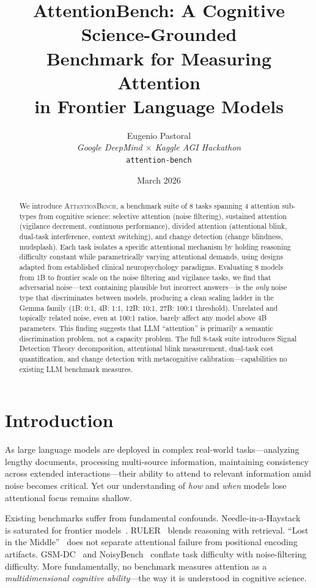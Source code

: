 \documentclass[11pt,twocolumn]{article}
\title{AttentionBench: A Cognitive Science-Grounded\\Benchmark for Measuring Attention\\in Frontier Language Models}
\author{%
  Eugenio Pastoral\\
  \textit{Google DeepMind $\times$ Kaggle AGI Hackathon}\\
  \texttt{attention-bench}
}
\date{March 2026}
\begin{document}
\maketitle

\begin{abstract}
We introduce \textsc{AttentionBench}, a benchmark suite of 8 tasks spanning 4 attention sub-types from cognitive science: selective attention (noise filtering), sustained attention (vigilance decrement, continuous performance), divided attention (attentional blink, dual-task interference, context switching), and change detection (change blindness, mudsplash). Each task isolates a specific attentional mechanism by holding reasoning difficulty constant while parametrically varying attentional demands, using designs adapted from established clinical neuropsychology paradigms. Evaluating 8 models from 1B to frontier scale on the noise filtering and vigilance tasks, we find that adversarial noise---text containing plausible but incorrect answers---is the \emph{only} noise type that discriminates between models, producing a clean scaling ladder in the Gemma family (1B: 0:1, 4B: 1:1, 12B: 10:1, 27B: 100:1 threshold). Unrelated and topically related noise, even at 100:1 ratios, barely affect any model above 4B parameters. This finding suggests that LLM ``attention'' is primarily a semantic discrimination problem, not a capacity problem. The full 8-task suite introduces Signal Detection Theory decomposition, attentional blink measurement, dual-task cost quantification, and change detection with metacognitive calibration---capabilities no existing LLM benchmark measures.
\end{abstract}

\section{Introduction}

As large language models are deployed in complex real-world tasks---analyzing lengthy documents, processing multi-source information, maintaining consistency across extended interactions---their ability to attend to relevant information amid noise becomes critical. Yet our understanding of \emph{how} and \emph{when} models lose attentional focus remains shallow.

Existing benchmarks suffer from fundamental confounds. Needle-in-a-Haystack~\citep{kamradt2023niah} is saturated for frontier models~\citep{yen2025helmet}. RULER~\citep{hsieh2024ruler} blends reasoning with retrieval. ``Lost in the Middle''~\citep{liu2024lost} does not separate attentional failure from positional encoding artifacts. GSM-DC~\citep{li2025gsmdc} and NoisyBench~\citep{noisybench2026} conflate task difficulty with noise-filtering difficulty. More fundamentally, no benchmark measures attention as a \emph{multidimensional cognitive ability}---the way it is understood in cognitive science.
\end{document}
